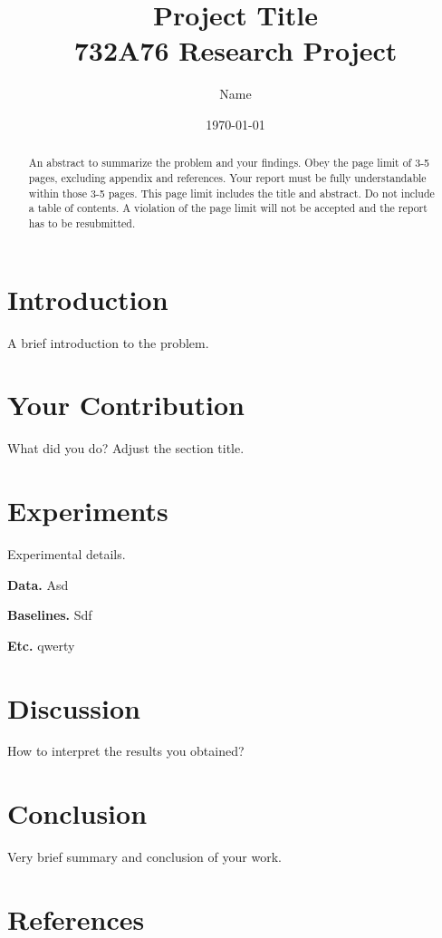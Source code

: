 \documentclass[11pt]{article}
\title{\textbf{Project Title}\\
\Large{732A76 Research Project}}
\author{%
    Name
}
\date{\today}
\begin{document}
\maketitle

\begin{abstract}
An abstract to summarize the problem and your findings.
Obey the page limit of 3-5 pages, excluding appendix and references. Your report must be fully understandable within those 3-5 pages. This page limit includes the title and abstract. Do not include a table of contents. A violation of the page limit will not be accepted and the report has to be resubmitted.
\end{abstract}

\section{Introduction}

A brief introduction to the problem.

\section{Your Contribution}

What did you do? Adjust the section title.

\section{Experiments}

Experimental details.

\textbf{Data.} Asd

\textbf{Baselines.} Sdf

\textbf{Etc.} qwerty

\section{Discussion}

How to interpret the results you obtained?

\section{Conclusion}

Very brief summary and conclusion of your work.

\section*{References}
\end{document}
